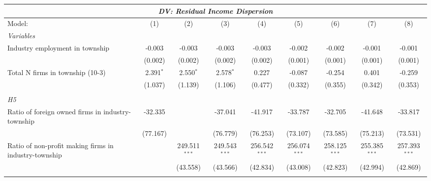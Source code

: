 \begingroup
\centering
\begin{tabular}{lcccccccc}
   \tabularnewline \multicolumn{9}{c}{\textit{DV: Residual Income Dispersion}} \\ \midrule \midrule
   Model:                                                & (1)         & (2)             & (3)             & (4)             & (5)             & (6)             & (7)             & (8)\\  
   \midrule
   \emph{Variables}\\
   Industry employment in township                       & -0.003      & -0.003          & -0.003          & -0.003          & -0.002          & -0.002          & -0.001          & -0.001\\   
                                                         & (0.002)     & (0.002)         & (0.002)         & (0.002)         & (0.001)         & (0.001)         & (0.001)         & (0.001)\\   
   Total N firms in township (10-3)                      & 2.391$^{*}$ & 2.550$^{*}$     & 2.578$^{*}$     & 0.227           & -0.087          & -0.254          & 0.401           & -0.259\\   
                                                         & (1.037)     & (1.139)         & (1.106)         & (0.477)         & (0.332)         & (0.355)         & (0.342)         & (0.353)\\   
\hdashline %
\\[0.1ex] %
\emph{H5} \\ 
   Ratio of foreign owned firms in industry-township     & -32.335     &                 & -37.041         & -41.917         & -33.787         & -32.705         & -41.648         & -33.817\\   
                                                         & (77.167)    &                 & (76.779)        & (76.253)        & (73.107)        & (73.585)        & (75.213)        & (73.531)\\   
   Ratio of non-profit making firms in industry-township &             & 249.511$^{***}$ & 249.543$^{***}$ & 256.542$^{***}$ & 256.074$^{***}$ & 258.125$^{***}$ & 255.385$^{***}$ & 257.393$^{***}$\\   
                                                         &             & (43.558)        & (43.566)        & (42.834)        & (43.008)        & (42.823)        & (42.994)        & (42.869)\\   
\hdashline %
\\[0.1ex] %

\end{tabular}

